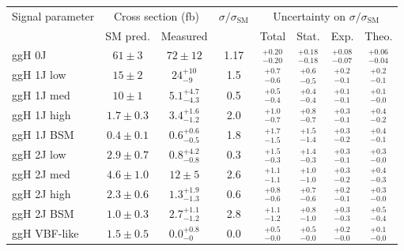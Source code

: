 \begin{tabular}{ l | c | c | c | c | c | c | c }
\multirow{2}{*}{Signal parameter} & \multicolumn{2}{c}{Cross section (fb)}  & \multirow{2}{*}{$\sigma/\sigma_{\text{SM}}$}    & \multicolumn{4}{c}{Uncertainty on $\sigma/\sigma_{\text{SM}}$} \\
  & \multicolumn{1}{c}{SM pred.}  & \multicolumn{1}{c}{Measured} &          & \multicolumn{1}{c}{Total}  & \multicolumn{1}{c}{Stat.} & \multicolumn{1}{c}{Exp.} & Theo.               \\
\hline
ggH 0J       & $61  \pm 3   $                & $72  \pm 12$                         & 1.17  & $_{-0.20}^{+0.20}$ & $_{-0.18}^{+0.18}$ & $_{-0.07}^{+0.08}$ & $_{-0.04}^{+0.06}$  \\[3pt]
ggH 1J low   & $15  \pm 2   $                & $24  ^{+10}_{-9}$                    & 1.5   & $_{-0.6}^{+0.7}$   & $_{-0.5}^{+0.6}$   & $_{-0.1}^{+0.2}$   & $_{-0.1}^{+0.2}$    \\[3pt]
ggH 1J med   & $10  \pm 1   $                & $5.1 ^{+4.7}_{-4.3}$                 & 0.5   & $_{-0.4}^{+0.5}$   & $_{-0.4}^{+0.4}$   & $_{-0.1}^{+0.1}$   & $_{-0.0}^{+0.1}$    \\[3pt]
ggH 1J high  & $1.7 \pm 0.3 $                & $3.4 ^{+1.6}_{-1.2}$                 & 2.0   & $_{-0.7}^{+1.0}$   & $_{-0.7}^{+0.8}$   & $_{-0.1}^{+0.3}$   & $_{-0.2}^{+0.4}$    \\[3pt]
ggH 1J BSM   & $0.4 \pm 0.1 $                & $0.6 ^{+0.6}_{-0.5}$                 & 1.8   & $_{-1.5}^{+1.7}$   & $_{-1.4}^{+1.5}$   & $_{-0.2}^{+0.3}$   & $_{-0.1}^{+0.4}$    \\[3pt]
ggH 2J low   & $2.9 \pm 0.7 $                & $0.8 ^{+4.2}_{-0.8}$                 & 0.3   & $_{-0.3}^{+1.5}$   & $_{-0.3}^{+1.4}$   & $_{-0.1}^{+0.3}$   & $_{-0.0}^{+0.3}$    \\[3pt]
ggH 2J med   & $4.6 \pm 1.0 $                & $12  \pm 5$                          & 2.6   & $_{-1.1}^{+1.1}$   & $_{-1.0}^{+1.0}$   & $_{-0.2}^{+0.3}$   & $_{-0.3}^{+0.4}$    \\[3pt]
ggH 2J high  & $2.3 \pm 0.6 $                & $1.3 ^{+1.9}_{-1.3}$                 & 0.6   & $_{-0.6}^{+0.8}$   & $_{-0.6}^{+0.7}$   & $_{-0.1}^{+0.2}$   & $_{-0.0}^{+0.3}$    \\[3pt]
ggH 2J BSM   & $1.0 \pm 0.3 $                & $2.7 ^{+1.1}_{-1.2}$                 & 2.8   & $_{-1.2}^{+1.1}$   & $_{-1.0}^{+0.8}$   & $_{-0.3}^{+0.3}$   & $_{-0.4}^{+0.5}$    \\[3pt]
ggH VBF-like & $1.5 \pm 0.5 $                & $0.0 ^{+0.8}_{-0}$                   & 0.0   & $_{-0.0}^{+0.5}$   & $_{-0.0}^{+0.5}$   & $_{-0.0}^{+0.2}$   & $_{-0.0}^{+0.1}$    \\[3pt]

\end{tabular}
